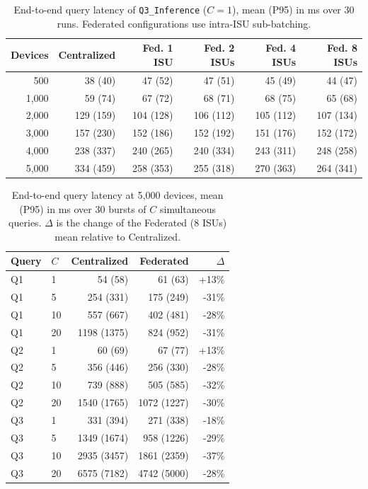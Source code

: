 
\begin{table}[t]
\centering
\caption{End-to-end query latency of \texttt{Q3\_Inference} ($C=1$), mean (P95) in ms over 30 runs. Federated configurations use intra-ISU sub-batching.}
\label{tab:query-exp1}
\begin{tabular}{rrrrrr}
\toprule
Devices & Centralized & Fed. 1 ISU & Fed. 2 ISUs & Fed. 4 ISUs & Fed. 8 ISUs \\
\midrule
500 & 38 (40) & 47 (52) & 47 (51) & 45 (49) & 44 (47) \\
1,000 & 59 (74) & 67 (72) & 68 (71) & 68 (75) & 65 (68) \\
2,000 & 129 (159) & 104 (128) & 106 (112) & 105 (112) & 107 (134) \\
3,000 & 157 (230) & 152 (186) & 152 (192) & 151 (176) & 152 (172) \\
4,000 & 238 (337) & 240 (265) & 240 (334) & 243 (311) & 248 (258) \\
5,000 & 334 (459) & 258 (353) & 255 (318) & 270 (363) & 264 (341) \\
\bottomrule
\end{tabular}
\end{table}

\begin{table}[t]
\centering
\caption{End-to-end query latency at 5{,}000 devices, mean (P95) in ms over 30 bursts of $C$ simultaneous queries. $\Delta$ is the change of the Federated (8 ISUs) mean relative to Centralized.}
\label{tab:query-exp2}
\begin{tabular}{llrrr}
\toprule
Query & $C$ & Centralized & Federated & $\Delta$ \\
\midrule
Q1 & 1 & 54 (58) & 61 (63) & +13\% \\
Q1 & 5 & 254 (331) & 175 (249) & -31\% \\
Q1 & 10 & 557 (667) & 402 (481) & -28\% \\
Q1 & 20 & 1198 (1375) & 824 (952) & -31\% \\
\midrule
Q2 & 1 & 60 (69) & 67 (77) & +13\% \\
Q2 & 5 & 356 (446) & 256 (330) & -28\% \\
Q2 & 10 & 739 (888) & 505 (585) & -32\% \\
Q2 & 20 & 1540 (1765) & 1072 (1227) & -30\% \\
\midrule
Q3 & 1 & 331 (394) & 271 (338) & -18\% \\
Q3 & 5 & 1349 (1674) & 958 (1226) & -29\% \\
Q3 & 10 & 2935 (3457) & 1861 (2359) & -37\% \\
Q3 & 20 & 6575 (7182) & 4742 (5000) & -28\% \\
\bottomrule
\end{tabular}
\end{table}

